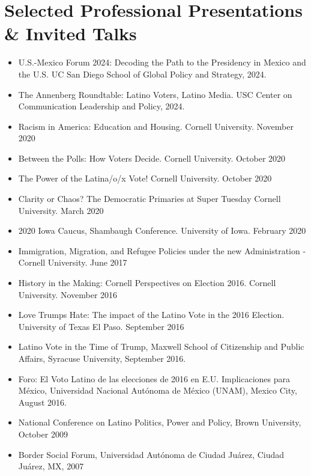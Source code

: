 \documentclass[11pt,letterpaper]{moderncv}
\begin{document}



\section{Selected Professional Presentations \& Invited Talks}


\begin{itemize}

\item U.S.-Mexico Forum 2024: Decoding the Path to the Presidency in Mexico and the U.S. UC San Diego School of Global Policy and Strategy, 2024.
\item The Annenberg Roundtable: Latino Voters, Latino Media. USC Center on Communication Leadership and Policy, 2024.
\item Racism in America: Education and Housing. Cornell University. November 2020
\item Between the Polls: How Voters Decide. Cornell University. October 2020
\item The Power of the Latina/o/x Vote! Cornell University. October 2020
\item Clarity or Chaos? The Democratic Primaries at Super Tuesday Cornell University. March 2020
\item 2020 Iowa Caucus, Shambaugh Conference. University of Iowa. February 2020
\item Immigration, Migration, and Refugee Policies under the new Administration - Cornell University. June 2017
\item History in the Making: Cornell Perspectives on Election 2016. Cornell University.  November 2016
\item Love Trumps Hate: The impact of the Latino Vote in the 2016 Election. University of Texas El Paso. September 2016
\item Latino Vote in the Time of Trump, Maxwell School of Citizenship and Public Affairs, Syracuse University, September 2016.
\item Foro: El Voto Latino de las elecciones de 2016 en E.U. Implicaciones para México, Universidad Nacional Autónoma de México (UNAM), Mexico City, August 2016.
\item National Conference on Latino Politics, Power and Policy, Brown University, October 2009
\item Border Social Forum, Universidad Autónoma de Ciudad Juárez, Ciudad Juárez, MX, 2007


\end{itemize}
\end{document}
